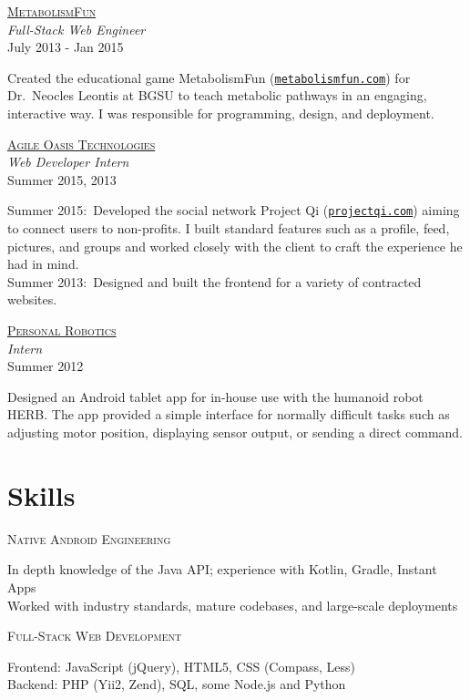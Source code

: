 \documentclass[letterpaper,10pt]{article}
\newcommand{\lb}{\vspace{4pt} \\}
\newenvironment{resumecols1}[1]
{
    \vspace{.1cm}
    \begin{minipage}[t]{.21\linewidth}
        \begin{flushright}
            \textsc{#1}
        \end{flushright}
    \end{minipage}
    \hspace{.005\linewidth}
    \begin{minipage}[t]{.77\linewidth}
}
{
    \end{minipage}
    \vspace{.1cm}
}
\newenvironment{resumecols}[4]
{
    \vspace{.1cm}
    \begin{minipage}[t]{.21\linewidth}
        \begin{flushright}
            \href{#2}{\textsc{#1}} \\
            \small{\textit{#3}} \\
            \small{#4}
        \end{flushright}
    \end{minipage}
    \hspace{.005\linewidth}
    \begin{minipage}[t]{.77\linewidth}
}
{
    \end{minipage}
    \vspace{.1cm}
}
\begin{document}
\begin{resumecols}{MetabolismFun}{http://metabolismfun.com}{Full-Stack Web Engineer}{July 2013 - Jan 2015}
    Created the educational game MetabolismFun (\href{http://metabolismfun.com}{\texttt{metabolismfun.com}}) for Dr.\ Neocles Leontis at BGSU to teach metabolic pathways in an engaging, interactive way. I was responsible for programming, design, and deployment.
\end{resumecols}

\begin{resumecols}{Agile Oasis Technologies}{http://agileoasis.com}{Web Developer Intern}{Summer 2015, 2013}
    Summer 2015:\ Developed the social network Project Qi (\href{http://www.projectqi.com}{\texttt{projectqi.com}}) aiming to connect users to non-profits. I built standard features such as a profile, feed, pictures, and groups and worked closely with the client to craft the experience he had in mind.
    \lb
    Summer 2013:\ Designed and built the frontend for a variety of contracted websites.
\end{resumecols}

\begin{resumecols}{Personal Robotics}{https://personalrobotics.ri.cmu.edu}{Intern}{Summer 2012}
    Designed an Android tablet app for in-house use with the humanoid robot HERB. The app provided a simple interface for normally difficult tasks such as adjusting motor position, displaying sensor output, or sending a direct command.
\end{resumecols}

\section{Skills}

\begin{resumecols1}{Native Android Engineering}
    In depth knowledge of the Java API; experience with Kotlin, Gradle, Instant Apps \\
    Worked with industry standards, mature codebases, and large-scale deployments
\end{resumecols1}

\begin{resumecols1}{Full-Stack Web Development}
    Frontend: JavaScript (jQuery), HTML5, CSS (Compass, Less) \\
    Backend: PHP (Yii2, Zend), SQL, some Node.js and Python
\end{resumecols1}
\end{document}
